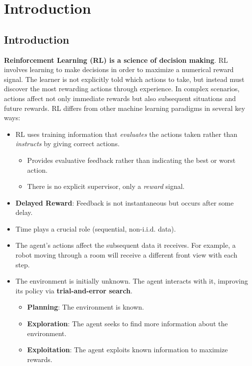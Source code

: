 \chapter{Introduction}
\section{Introduction}

\textbf{Reinforcement Learning (RL) is a science of decision making}. RL involves learning to make decisions in order to maximize a numerical reward signal. The learner is not explicitly told which actions to take, but instead must discover the most rewarding actions through experience. In complex scenarios, actions affect not only immediate rewards but also subsequent situations and future rewards. RL differs from other machine learning paradigms in several key ways:
\begin{itemize}
	\item RL uses training information that \textit{evaluates} the actions taken rather than \textit{instructs} by giving correct actions.
    \begin{itemize}
        \item Provides evaluative feedback rather than indicating the best or worst action.
        \item There is no explicit supervisor, only a \textit{reward} signal.
    \end{itemize}
    \item \textbf{Delayed Reward}: Feedback is not instantaneous but occurs after some delay.
    \item Time plays a crucial role (sequential, non-i.i.d. data).
    \item The agent’s actions affect the subsequent data it receives. For example, a robot moving through a room will receive a different front view with each step.
    \item The environment is initially unknown. The agent interacts with it, improving its policy via \textbf{trial-and-error search}.
    \begin{itemize}
        \item \textbf{Planning}: The environment is known.
        \item \textbf{Exploration}: The agent seeks to find more information about the environment.
        \item \textbf{Exploitation}: The agent exploits known information to maximize rewards.
    \end{itemize}
\end{itemize}

